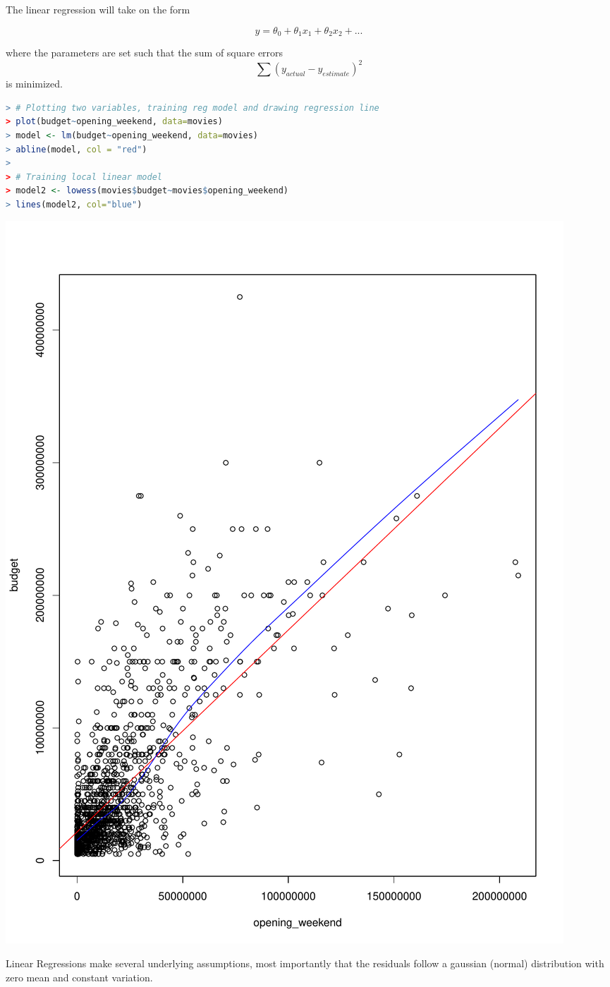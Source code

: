 \documentclass{article}
\begin{document}
\begin{spacing}{1.1}
The linear regression will take on the form

$$ y = \theta_0 + \theta_1x_1 + \theta_2x_2 + ...$$

where the parameters are set such that the sum of square errors $$\sum (y_{actual} - y_{estimate})^2$$ is minimized.  

\vspace{3mm}

\begin{lstlisting}[language=R]
> # Plotting two variables, training reg model and drawing regression line
> plot(budget~opening_weekend, data=movies)
> model <- lm(budget~opening_weekend, data=movies)
> abline(model, col = "red")
> 
> # Training local linear model
> model2 <- lowess(movies$budget~movies$opening_weekend)
> lines(model2, col="blue")
\end{lstlisting}


\includegraphics[scale=0.4]{LinearRegression1.pdf}

Linear Regressions make several underlying assumptions, most importantly that the residuals follow a gaussian (normal) distribution with zero mean and constant variation.  



\end{spacing}
\end{document}
